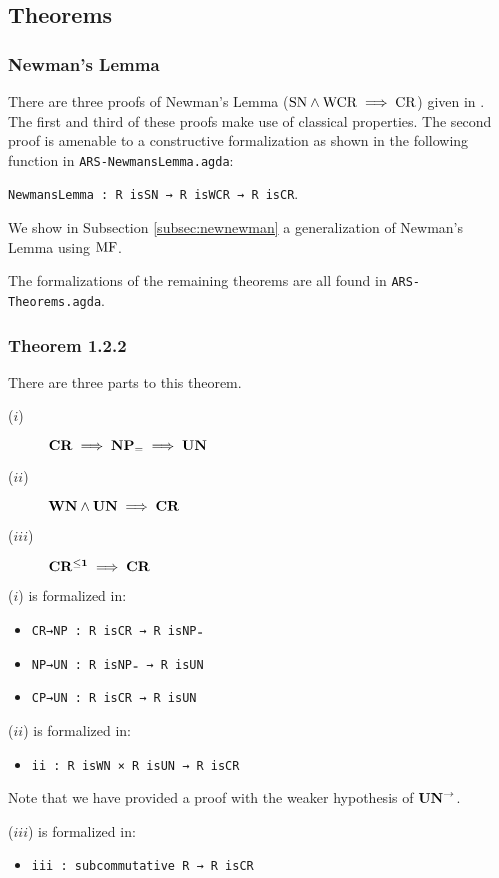 \subsection{Theorems}
\subsubsection{Newman's Lemma}
There are three proofs of Newman's Lemma ($\mathrm{SN} \land \mathrm{WCR} \implies \mathrm{CR}$) given in \terese. 
The first and third of these proofs make use of classical properties. The second proof is amenable to a 
constructive formalization as shown in the following function in \texttt{ARS-NewmansLemma.agda}:

\verb|NewmansLemma : R isSN → R isWCR → R isCR|.

We show in Subsection \ref{subsec:newnewman} a generalization of Newman's Lemma using $\mathrm{MF}$. 

The formalizations of the remaining theorems are all found in \texttt{ARS-Theorems.agda}. 
\subsubsection{Theorem 1.2.2}
There are three parts to this theorem. 
\begin{description}
    \item[($i$)] $\mathbf{CR} \implies \mathbf{NP_=} \implies \mathbf{UN}$
    \item[($ii$)] $\mathbf{WN} \land \mathbf{UN} \implies \mathbf{CR}$  
    \item[($iii$)] $\mathbf{CR^{\le 1}} \implies \mathbf{CR}$
\end{description}

($i$) is formalized in:
\begin{itemize}
    \item \verb|CR→NP : R isCR → R isNP₌|
    \item \verb|NP→UN : R isNP₌ → R isUN|
    \item \verb|CP→UN : R isCR → R isUN|
\end{itemize}

($ii$) is formalized in:
\begin{itemize}
    \item \verb|ii : R isWN × R isUN → R isCR|
\end{itemize}
Note that we have provided a proof with the weaker hypothesis of $\mathbf{UN}^{\to}$. 

($iii$) is formalized in:
\begin{itemize}
    \item \verb|iii : subcommutative R → R isCR|
\end{itemize}

